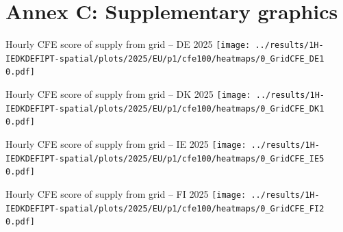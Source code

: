
\section{Annex C: Supplementary graphics}




\begin{frame}{Hourly CFE score of supply from grid -- DE 2025}
  \label{CFEheatmaps}
  \vspace{.5cm}
  \texttt{[image: ../results/1H-IEDKDEFIPT-spatial/plots/2025/EU/p1/cfe100/heatmaps/0\_GridCFE\_DE1 0.pdf]}
\end{frame}

\begin{frame}{Hourly CFE score of supply from grid -- DK 2025}
  \vspace{.5cm}
  \texttt{[image: ../results/1H-IEDKDEFIPT-spatial/plots/2025/EU/p1/cfe100/heatmaps/0\_GridCFE\_DK1 0.pdf]}
\end{frame}

\begin{frame}{Hourly CFE score of supply from grid -- IE 2025}
  \vspace{.5cm}
  \texttt{[image: ../results/1H-IEDKDEFIPT-spatial/plots/2025/EU/p1/cfe100/heatmaps/0\_GridCFE\_IE5 0.pdf]}
\end{frame}

\begin{frame}{Hourly CFE score of supply from grid -- FI 2025}
  \vspace{.5cm}
  \texttt{[image: ../results/1H-IEDKDEFIPT-spatial/plots/2025/EU/p1/cfe100/heatmaps/0\_GridCFE\_FI2 0.pdf]}
\end{frame}



